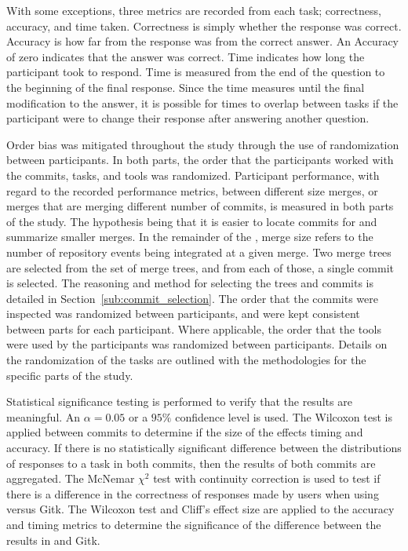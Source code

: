 With some exceptions, three metrics are recorded from each task;
correctness, accuracy, and time taken. Correctness is simply whether the
response was correct. Accuracy is how far from the response was from the
correct answer. An Accuracy of zero indicates that the answer was
correct. Time indicates how long the participant took to respond. Time
is measured from the end of the question to the beginning of the final
response. Since the time measures until the final modification to the
answer, it is possible for times to overlap between tasks if the
participant were to change their response after answering another
question.

Order bias was mitigated throughout the study through the use of
randomization between participants. In both parts, the order that the
participants worked with the commits, tasks, and tools was randomized.
Participant performance, with regard to the recorded performance
metrics, between different size merges, or merges that are merging
different number of commits, is measured in both parts of the study. The
hypothesis being that it is easier to locate commits for and summarize
smaller merges. In the remainder of the \paper{}, merge size refers to
the number of repository events being integrated at a given merge. Two
merge trees are selected from the set of merge trees, and from each of
those, a single commit is selected. The reasoning and method for
selecting the trees and commits is detailed in
Section~\ref{sub:commit_selection}. The order that the commits were
inspected was randomized between participants, and were kept consistent
between parts for each participant. Where applicable, the order that the
tools were used by the participants was randomized between participants.
Details on the randomization of the tasks are outlined with the
methodologies for the specific parts of the study.

Statistical significance testing is performed to verify that the results
are meaningful. An $\alpha = 0.05$ or a $95\%$ confidence level is used.
The Wilcoxon test\cite{Wilcoxon45} is applied between commits to
determine if the size of the \mt effects timing and accuracy. If there
is no statistically significant difference between the distributions of
responses to a task in both commits, then the results of both commits
are aggregated. The McNemar $\chi^2$ test\cite{McNemar1947} with
continuity correction is used to test if there is a difference in the
correctness of responses made by users when using \tool{} versus Gitk.
The Wilcoxon test\cite{Wilcoxon45} and Cliff's effect size\cite{Cliff93}
are applied to the accuracy and timing metrics to determine the
significance of the difference between the results in \tool{} and Gitk.

